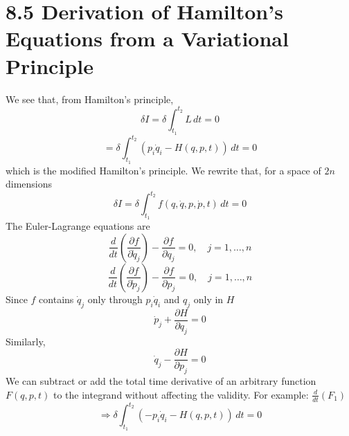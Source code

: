 \documentclass[12pt]{article}
\begin{document}
	\section*{8.5 Derivation of Hamilton's Equations from a Variational Principle}
	
	We see that, from Hamilton's principle,
	\[ \delta I = \delta \int_{t_1}^{t_2} L \, dt = 0 \]
	\[ = \delta \int_{t_1}^{t_2} (p_i \dot{q}_i - H(q, p, t)) \, dt = 0 \]
	which is the modified Hamilton's principle.
	We rewrite that, for a space of $2n$ dimensions
	\[ \delta I = \delta \int_{t_1}^{t_2} f(q, \dot{q}, p, \dot{p}, t) \, dt = 0 \]
	The Euler-Lagrange equations are
	\[ \frac{d}{dt}\left(\frac{\partial f}{\partial \dot{q}_j}\right) - \frac{\partial f}{\partial q_j} = 0, \quad j=1, \dots, n \]
	\[ \frac{d}{dt}\left(\frac{\partial f}{\partial \dot{p}_j}\right) - \frac{\partial f}{\partial p_j} = 0, \quad j=1, \dots, n \]
	Since $f$ contains $\dot{q}_j$ only through $p_i \dot{q}_i$ and $q_j$ only in $H$
	\[ \dot{p}_j + \frac{\partial H}{\partial q_j} = 0 \]
	Similarly,
	\[ \dot{q}_j - \frac{\partial H}{\partial p_j} = 0 \]
	We can subtract or add the total time derivative of an arbitrary function $F(q, p, t)$ to the integrand without affecting the validity.
	For example: $\frac{d}{dt}(F_1)$
	\[ \Rightarrow \delta \int_{t_1}^{t_2} (-p_i \dot{q}_i - H(q, p, t)) \, dt = 0 \]
	
\end{document}
